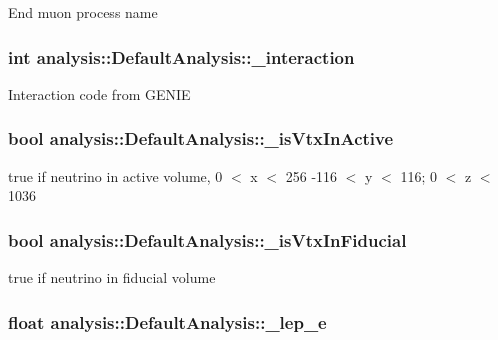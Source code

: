 End muon process name \hypertarget{classanalysis_1_1DefaultAnalysis_a35c01b4be6d678e89cada927ab2ba45c}{
\subsubsection[{\-\_\-interaction}]{\setlength{\rightskip}{0pt plus 5cm}int analysis\-::\-Default\-Analysis\-::\-\_\-interaction\hspace{0.3cm}{\ttfamily [private]}}}\label{classanalysis_1_1DefaultAnalysis_a35c01b4be6d678e89cada927ab2ba45c}
Interaction code from G\-E\-N\-I\-E \hypertarget{classanalysis_1_1DefaultAnalysis_a9c03fca7c9d596e0cb490aef4bcd3aed}{
\subsubsection[{\-\_\-is\-Vtx\-In\-Active}]{\setlength{\rightskip}{0pt plus 5cm}bool analysis\-::\-Default\-Analysis\-::\-\_\-is\-Vtx\-In\-Active\hspace{0.3cm}{\ttfamily [private]}}}\label{classanalysis_1_1DefaultAnalysis_a9c03fca7c9d596e0cb490aef4bcd3aed}
true if neutrino in active volume, 0 $<$ x $<$ 256 -\/116 $<$ y $<$ 116; 0 $<$ z $<$ 1036 \hypertarget{classanalysis_1_1DefaultAnalysis_a3235e005677abb89da08d1668257bca3}{
\subsubsection[{\-\_\-is\-Vtx\-In\-Fiducial}]{\setlength{\rightskip}{0pt plus 5cm}bool analysis\-::\-Default\-Analysis\-::\-\_\-is\-Vtx\-In\-Fiducial\hspace{0.3cm}{\ttfamily [private]}}}\label{classanalysis_1_1DefaultAnalysis_a3235e005677abb89da08d1668257bca3}
true if neutrino in fiducial volume \hypertarget{classanalysis_1_1DefaultAnalysis_ab00e533228597e83340a23d04b986086}{
\subsubsection[{\-\_\-lep\-\_\-e}]{\setlength{\rightskip}{0pt plus 5cm}float analysis\-::\-Default\-Analysis\-::\-\_\-lep\-\_\-e\hspace{0.3cm}{\ttfamily [private]}}}\label{classanalysis_1_1DefaultAnalysis_ab00e533228597e83340a23d04b986086}

